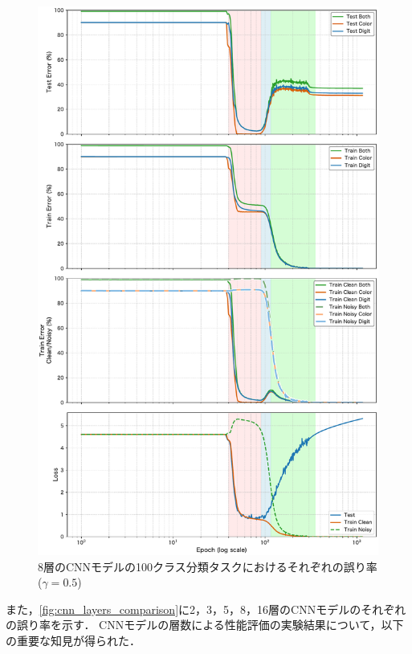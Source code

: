 \begin{figure}[H]
\begin{minipage}[t]{0.48\linewidth}
        \includegraphics[width=\linewidth]{fig/layer_comparison/cnn8_error_comp_layer.pdf}
        \caption{8層のCNNモデルの100クラス分類タスクにおけるそれぞれの誤り率($\gamma = 0.5$)}
        \label{fig:8layer_results}
    \end{minipage}
\end{figure}

また，\ref{fig:cnn_layers_comparison}に2，3，5，8，16層のCNNモデルのそれぞれの誤り率を示す．
CNNモデルの層数による性能評価の実験結果について，以下の重要な知見が得られた．

